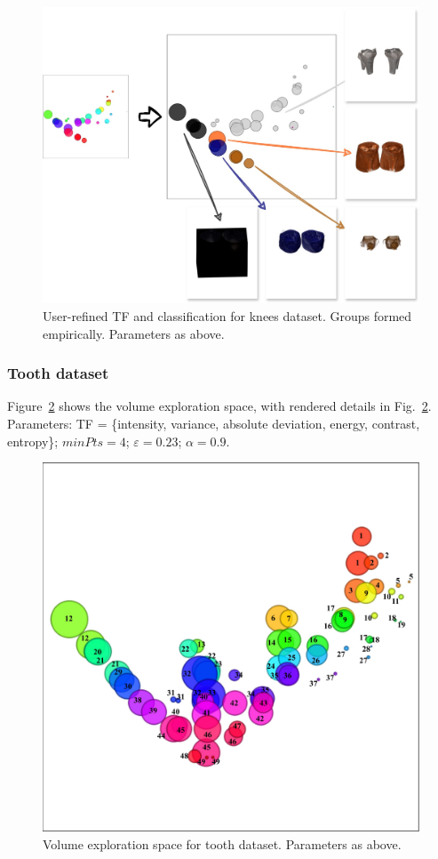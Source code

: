 \begin{figure}[htb!]
    \centering
    \includegraphics[width=\columnwidth]{figs/knees-groups.jpg}
    \caption{User-refined TF and classification for knees dataset. Groups formed empirically. Parameters as above.}
    \label{fig:knees-groups}
\end{figure}

\subsubsection{Tooth dataset}
\label{subsubsect:tooth-dataset}

Figure~\ref{fig:tooth-clusters} shows the volume exploration space, with rendered details in Fig.~\ref{fig:tooth-clusters}. Parameters: TF = \{intensity, variance, absolute deviation, energy, contrast, entropy\}; $minPts=4$; $\varepsilon=0.23$; $\alpha=0.9$.

\begin{figure}[htb!]
    \centering
    \includegraphics[width=0.7\columnwidth]{figs/tooth-clusters-tf.jpg} 
    \caption{Volume exploration space for tooth dataset. Parameters as above.}
    \label{fig:tooth-clusters}
\end{figure}

